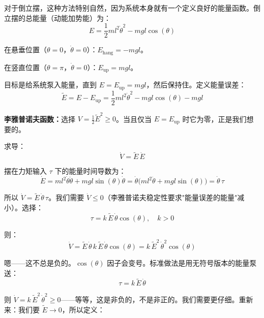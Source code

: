 对于倒立摆，这种方法特别自然，因为系统本身就有一个定义良好的能量函数。倒立摆的总能量（动能加势能）为：
\begin{equation}
E = \frac{1}{2}ml^2\dot{\theta}^2 - mgl\cos(\theta)
\end{equation}

在悬垂位置（$\theta = 0$，$\dot{\theta} = 0$）：$E_{\text{hang}} = -mgl$。

在竖直位置（$\theta = \pi$，$\dot{\theta} = 0$）：$E_{\text{up}} = mgl$。

目标是给系统泵入能量，直到 $E = E_{\text{up}} = mgl$，然后保持住。定义能量误差：
\begin{equation}
\tilde{E} = E - E_{\text{up}} = \frac{1}{2}ml^2\dot{\theta}^2 - mgl\cos(\theta) - mgl
\end{equation}

\textbf{李雅普诺夫函数：}选择 $V = \frac{1}{2}\tilde{E}^2 \geq 0$。当且仅当 $E = E_{\text{up}}$ 时它为零，正是我们想要的。

求导：
\begin{equation}
\dot{V} = \tilde{E}\,\dot{E}
\end{equation}

摆在力矩输入 $\tau$ 下的能量时间导数为：
\begin{equation}
\dot{E} = ml^2\dot{\theta}\ddot{\theta} + mgl\sin(\theta)\dot{\theta} = \dot{\theta}\bigl(ml^2\ddot{\theta} + mgl\sin(\theta)\bigr) = \dot{\theta}\,\tau
\end{equation}

所以 $\dot{V} = \tilde{E}\,\dot{\theta}\,\tau$。我们需要 $\dot{V} \leq 0$（李雅普诺夫稳定性要求"能量误差的能量"减小）。选择：
\begin{equation}
\tau = k\,\tilde{E}\,\dot{\theta}\cos(\theta), \quad k > 0
\end{equation}

则：
\begin{equation}
\dot{V} = \tilde{E}\,\dot{\theta}\,k\,\tilde{E}\,\dot{\theta}\cos(\theta) = k\,\tilde{E}^2\,\dot{\theta}^2\cos(\theta)
\end{equation}

嗯——这不总是负的。$\cos(\theta)$ 因子会变号。标准做法是用无符号版本的能量泵送：
\begin{equation}
\tau = k\,\tilde{E}\,\dot{\theta}
\end{equation}

则 $\dot{V} = k\,\tilde{E}^2\,\dot{\theta}^2 \geq 0$——等等，这是非负的，不是非正的。我们需要更仔细。重新来：我们要 $\tilde{E} \to 0$，所以定义：

